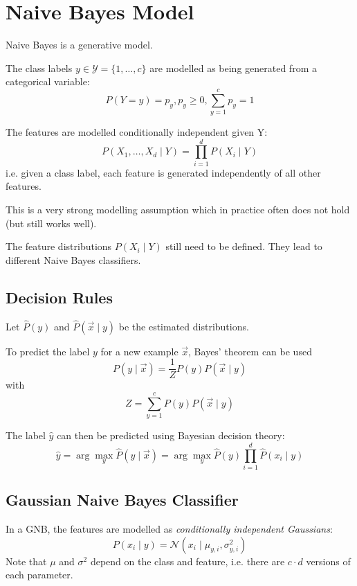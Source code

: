 \section{Naive Bayes Model}
Naive Bayes is a generative model.

The class labels
$y \in \mathcal{Y} = \{1, \dotsc, c\}$
are modelled as being generated
from a categorical variable:
\begin{equation*}
    P(Y = y) = p_y, p_y \geq 0, \sum_{y=1}^c{p_y} = 1
\end{equation*}

The features are modelled conditionally
independent given Y:
\begin{equation*}
    P(X_1, \dotsc, X_d \mid Y)
    = \prod_{i=1}^d{P(X_i \mid Y)}
\end{equation*}
i.e. given a class label,
each feature is generated independently
of all other features.

This is a very strong modelling assumption
which in practice often does not hold
(but still works well).

The feature distributions $P(X_i \mid Y)$
still need to be defined.
They lead to different Naive Bayes classifiers.


\subsection{Decision Rules}
Let $\hat{P}(y)$ and
$\hat{P}(\vec{x} \mid y)$
be the estimated distributions.

To predict the label $y$ for a new
example $\vec{x}$,
Bayes' theorem can be used
\begin{equation*}
    P(y \mid \vec{x}) =
    \frac{1}{Z} P(y) P(\vec{x} \mid y)
\end{equation*}
with
\begin{equation*}
    Z = \sum_{y=1}^c{
        P(y) P(\vec{x} \mid y)
    }
\end{equation*}

The label $\hat{y}$ can then be
predicted using Bayesian decision theory:
\begin{equation*}
    \hat{y} =
    \arg\max_y{\hat{P}(y \mid \vec{x})} =
    \arg\max_y{\hat{P}(y) \prod_{i=1}^d{\hat{P}(x_i \mid y)}}
\end{equation*}


\subsection{Gaussian Naive Bayes Classifier}
In a GNB, the features are modelled
as \emph{conditionally independent Gaussians}:
\begin{equation*}
    P(x_i \mid y)
    = \mathcal{N}(x_i \mid \mu_{y,i}, \sigma^2_{y, i})
\end{equation*}
Note that $\mu$ and $\sigma^2$
depend on the class and feature,
i.e. there are $c \cdot d$
versions of each parameter.

